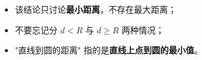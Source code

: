 \begin{trapbox}
\begin{itemize}
  \item 该结论只讨论\textbf{最小距离}，不存在最大距离；
  \item 不要忘记分 $d<R$ 与 $d\ge R$ 两种情况；
  \item "直线到圆的距离"
  指的是\textbf{直线上点到圆的最小值}。
\end{itemize}
\end{trapbox}
